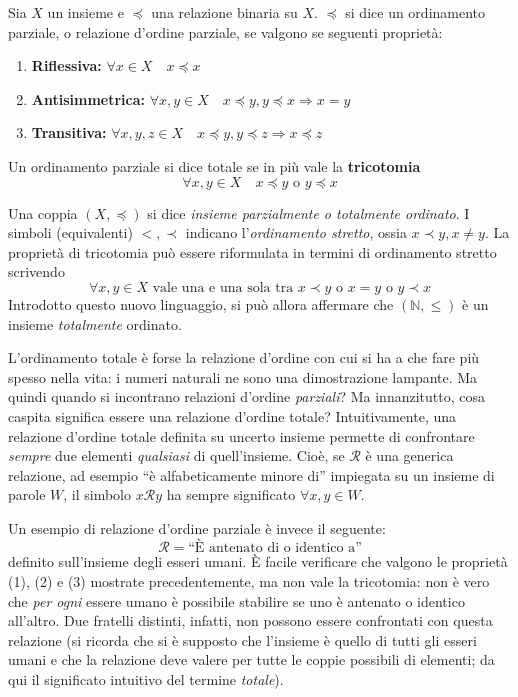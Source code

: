 \begin{tcolorbox}[colback=yellow!30, colframe=yellow!30!black, title={Relazione d'ordine parziale e totale}]
Sia $X$ un insieme e $\preceq$ una relazione binaria su
$X$. $\preceq$ si dice un ordinamento parziale, o relazione
d'ordine parziale, se valgono se seguenti proprietà:
\begin{enumerate}
    \item \textbf{Riflessiva:} $\forall x\in X \quad x\preceq x$
    \item \textbf{Antisimmetrica:} $\forall x,y\in X \quad x\preceq y, y\preceq x \Longrightarrow x = y$
    \item \textbf{Transitiva:} $\forall x,y,z\in X \quad x\preceq y, y\preceq z \Longrightarrow x\preceq z$
\end{enumerate}
Un ordinamento parziale si dice totale se in più vale la \textbf{tricotomia}
\[ \forall x,y\in X \quad x\preceq y \text{ o } y\preceq x \]
\end{tcolorbox}
Una coppia $(X,\preceq)$ si dice \textit{insieme parzialmente o totalmente
ordinato}.
I simboli (equivalenti) $<,\prec$ indicano l'\textit{ordinamento stretto}, ossia
$x\prec y, x\not=y$. La proprietà di tricotomia può essere riformulata
in termini di ordinamento stretto scrivendo
\[ \forall x,y\in X \text{ vale una e una sola tra } x\prec y \text{ o } x=y \text{ o } y\prec x \]
Introdotto questo nuovo linguaggio, si può allora affermare che
$(\mathbb{N},\leq)$ è un insieme \textit{totalmente} ordinato.

L'ordinamento totale è forse la relazione d'ordine con cui si ha a che
fare più spesso nella vita: i numeri naturali ne sono una dimostrazione
lampante. Ma quindi quando si incontrano relazioni d'ordine \textit{parziali}?
Ma innanzitutto, cosa caspita significa essere una relazione d'ordine totale? Intuitivamente,
una relazione d'ordine totale definita su uncerto insieme permette di
confrontare \textit{sempre} due elementi \textit{qualsiasi} di
quell'insieme. Cioè, se $\mathcal{R}$ è una generica relazione, ad esempio
``è alfabeticamente minore di'' impiegata su un insieme di parole $W$,
il simbolo $x\mathcal{R}y$ ha sempre significato $\forall x,y\in W$.

Un esempio di relazione d'ordine parziale è invece il seguente:
\[ \mathcal{R} = \text{``È antenato di o identico a''} \]
definito sull'insieme degli esseri umani. È facile verificare che
valgono le proprietà (1), (2) e (3) mostrate precedentemente, ma
non vale la tricotomia: non è vero che \textit{per ogni} essere
umano è possibile stabilire se uno è antenato o identico all'altro.
Due fratelli distinti, infatti, non possono essere confrontati con questa
relazione (si ricorda che si è supposto che l'insieme è quello di tutti
gli esseri umani e che la relazione deve valere per tutte le coppie
possibili di elementi; da qui il significato intuitivo del termine
\textit{totale}).

